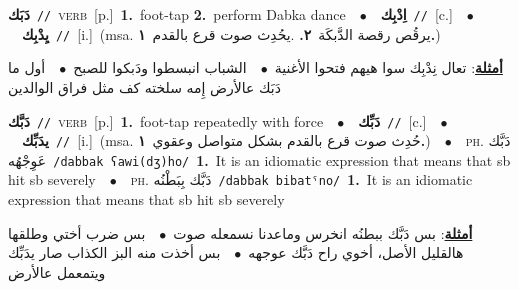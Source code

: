 \documentclass[10pt,a4paper,twoside]{article} %
\begin{document}
\begin{multicols}{2}
{\setlength\topsep{0pt}\textbf{\foreignlanguage{arabic}{دَبَك}}\ {\color{gray}\texttt{//}\color{black}}\ \textsc{verb}\ [p.]\ \textbf{1.}~foot-tap  \textbf{2.}~perform Dabka dance\ \ $\bullet$\ \ \setlength\topsep{0pt}\textbf{\foreignlanguage{arabic}{اِدْبِك}}\ {\color{gray}\texttt{//}\color{black}}\ [c.]\ \ $\bullet$\ \ \setlength\topsep{0pt}\textbf{\foreignlanguage{arabic}{يِدْبِك}}\ {\color{gray}\texttt{//}\color{black}}\ [i.]\ \color{gray}(msa. \foreignlanguage{arabic}{يرقُص رقصة الدَّبكَة}~\foreignlanguage{arabic}{\textbf{٢.}}  .\foreignlanguage{arabic}{يحُدِث صوت قرع بالقدم}~\foreignlanguage{arabic}{\textbf{١.}})\color{black}\  \begin{flushright}\color{gray}\foreignlanguage{arabic}{\textbf{\underline{\foreignlanguage{arabic}{أمثلة}}}: تعال نِدْبِك سوا هيهم فتحوا الأغنية\ $\bullet$\ \  الشباب انبسطوا ودَبكوا للصبح\ $\bullet$\ \  أول ما دَبَك عالأرض إِمه سلخته كف مثل فراق الوالدين}\end{flushright}\color{black}} \vspace{2mm}

{\setlength\topsep{0pt}\textbf{\foreignlanguage{arabic}{دَبَّك}}\ {\color{gray}\texttt{//}\color{black}}\ \textsc{verb}\ [p.]\ \textbf{1.}~foot-tap repeatedly with force\ \ $\bullet$\ \ \setlength\topsep{0pt}\textbf{\foreignlanguage{arabic}{دَبِّك}}\ {\color{gray}\texttt{//}\color{black}}\ [c.]\ \ $\bullet$\ \ \setlength\topsep{0pt}\textbf{\foreignlanguage{arabic}{يدَبِّك}}\ {\color{gray}\texttt{//}\color{black}}\ [i.]\ \color{gray}(msa. \foreignlanguage{arabic}{حُدِث صوت قرع بالقدم بشكل متواصل وعقوي}~\foreignlanguage{arabic}{\textbf{١.}})\color{black}\ \ $\bullet$\ \ \textsc{ph.} \color{gray} \foreignlanguage{arabic}{دَبَّك عَوِجْهُه}\color{black}\ {\color{gray}\texttt{/{\sffamily dabbak ʕawi(dʒ)ho}/}\color{black}}\ \textbf{1.}~It is an idiomatic expression that means that sb hit sb severely\ \ $\bullet$\ \ \textsc{ph.} \color{gray} \foreignlanguage{arabic}{دَبَّك بِبَطْنُه}\color{black}\ {\color{gray}\texttt{/{\sffamily dabbak bibatˤno}/}\color{black}}\ \textbf{1.}~It is an idiomatic expression that means that sb hit sb severely\  \begin{flushright}\color{gray}\foreignlanguage{arabic}{\textbf{\underline{\foreignlanguage{arabic}{أمثلة}}}: بس دَبَّك ببطنُه انخرس وماعدنا نسمعله صوت\ $\bullet$\ \  بس ضرب أختي وطلقها هالقليل الأصل، أخوي راح دَبَّك عوجهه\ $\bullet$\ \  بس أخذت منه البز الكذاب صار يدَبِّك ويتمعمل عالأرض}\end{flushright}\color{black}} \vspace{2mm}


\end{multicols}
\end{document}
